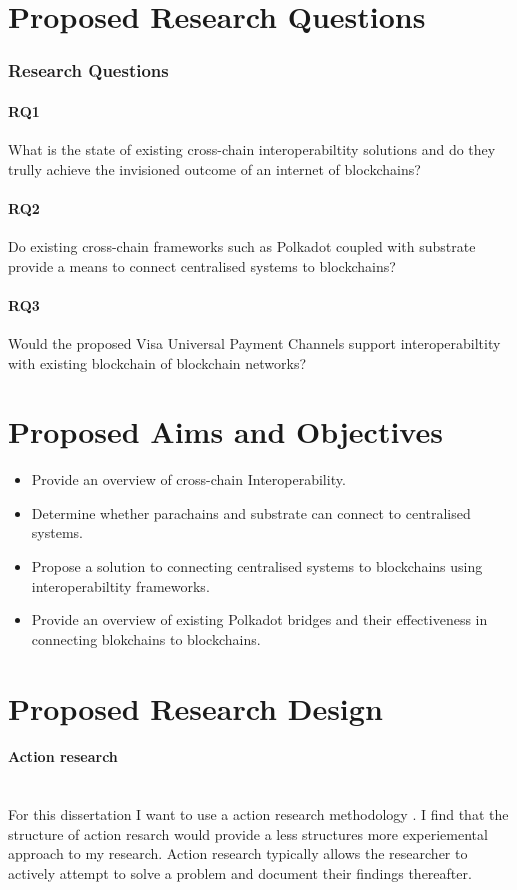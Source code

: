 \documentclass[12pt]{article}
\begin{document}
\section{Proposed Research Questions}
\subsubsection{Research Questions}
\paragraph{RQ1} What is the state of existing cross-chain interoperabiltity solutions and do they trully achieve the invisioned outcome of an internet of blockchains? 
\paragraph{RQ2} Do existing cross-chain frameworks such as Polkadot coupled with substrate provide a means to connect centralised systems to blockchains? 
\paragraph{RQ3} Would the proposed Visa Universal Payment Channels support interoperabiltity with existing blockchain of blockchain networks?

\section{Proposed Aims and Objectives}
\begin{itemize}
    \item Provide an overview of cross-chain Interoperability.
    \item Determine whether parachains and substrate can connect to centralised systems.
    \item Propose a solution to connecting centralised systems to blockchains using interoperabiltity frameworks.
    \item Provide an overview of existing Polkadot bridges and their effectiveness in connecting blokchains to blockchains.
\end{itemize}

\section{Proposed Research Design}
\paragraph{Action research}\mbox{} \\
For this dissertation I want to use a action research methodology \autocite{10.5555/2842927}. I find that the structure of action resarch would provide a 
less structures more experiemental approach to my research. Action research typically allows the researcher to actively attempt to solve a problem and document their findings thereafter.
\end{document}
